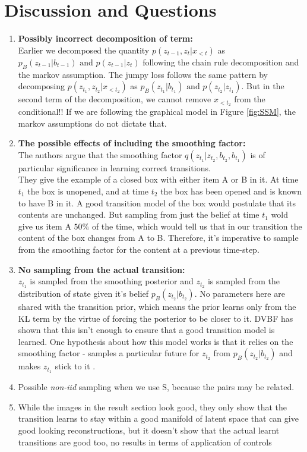 \documentclass[10pt,twocolumn,letterpaper]{article}
\begin{document}
\section{Discussion and Questions}
	\begin{enumerate}
		\item \textbf{Possibly incorrect decomposition of term: }\\Earlier we decomposed the quantity $p(z_{t-1}, z_t| x_{< t})$ as $p_B(z_{t-1}|b_{t-1}) \text{ and } p(z_{t-1}|z_t)$ following the chain rule decomposition and the markov assumption. The jumpy loss follows the same pattern by decomposing $p(z_{t_1}, z_{t_2}| x_{< t_2})$ as $p_B(z_{t_1}|b_{t_1}) \text{ and } p(z_{t_2}|z_{t_1})$. But in the second term of the decomposition, we cannot remove $x_{< t_2}$ from the conditional!! If we are following the graphical model in Figure \ref{fig:SSM}, the markov assumptions do not dictate that.
		\item \textbf{The possible effects of including the smoothing factor: }\\
		The authors argue that the smoothing factor $q(z_{t_1}| z_{t_2}, b_{t_2}, b_{t_1})$ is of particular significance in learning correct transitions. \vspace{4mm} \\
		They give the example of a closed box with either item A or B in it. At time $t_1$ the box is unopened, and at time $t_2$ the box has been opened and is known to have B in it. A good transition model of the box would postulate that its contents are unchanged. But sampling from just the belief at time $t_1$ wold give us item A $50\%$ of the time, which would tell us that in our transition the content of the box changes from A to B. Therefore, it's imperative to sample from the smoothing factor for the content at a previous time-step.
		\item \textbf{No sampling from the actual transition: } \\
		$z_{t_1}$ is sampled from the smoothing posterior and $z_{t_2}$ is sampled from the distribution of state given it's belief $p_B(z_{t_2}|b_{t_2})$. No parameters here are shared with the transition prior, which means the prior learns only from the KL term by the virtue of forcing the posterior to be closer to it. DVBF\cite{karl2016deep} has shown that this isn't enough to ensure that a good transition model is learned. One hypothesis about how this model works is that it relies on the smoothing factor - samples a particular future for $z_{t_2}$ from $p_B(z_{t_2}|b_{t_2})$ and makes $z_{t_1}$ stick to it .
		\item Possible \emph{non-iid} sampling when we use S, because the pairs may be related.
		\item While the images in the result section look good, they only show that the transition learns to stay within a good manifold of latent space that can give good looking reconstructions, but it doesn't show that the actual learnt transitions are good too, no results in terms of application of controls
	\end{enumerate}

	
	
	
\end{document}
